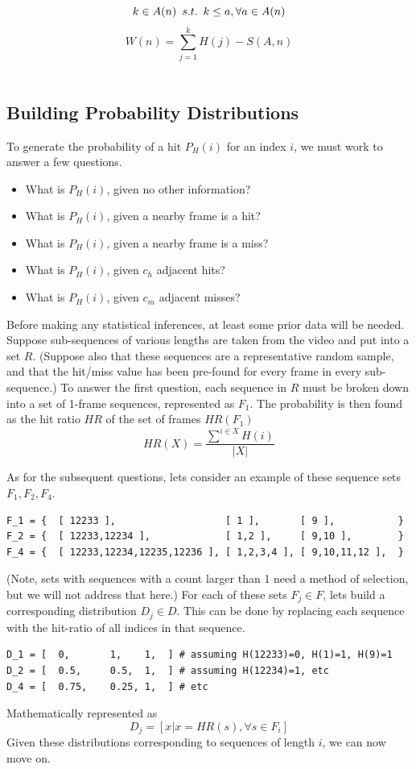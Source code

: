 \documentclass{article}
\def\suchThat{\hspace{0.5em} s.t. \hspace{0.5em}}
\newcommand{\br}{ \hfill \break}
\begin{document}
\begin{adjustwidth}{2.5em}{0pt}
            $$ k \in A(n) \suchThat k \leq a, \forall a \in A(n) $$
            $$ W(n) = \displaystyle\sum_{j=1}^{k} H(j) - S(A, n) $$ \\
        
    
    \subsection{Building Probability Distributions}
        To generate the probability of a hit $P_H(i)$ for an index $i$, we must work to answer a few questions.
        \begin{itemize}
            \item What is $P_H(i)$, given no other information?
            \item What is $P_H(i)$, given a nearby frame is a hit?
            \item What is $P_H(i)$, given a nearby frame is a miss?
            \item What is $P_H(i)$, given $c_h$ adjacent hits?
            \item What is $P_H(i)$, given $c_m$ adjacent misses?
        \end{itemize}
        Before making any statistical inferences, at least some prior data will be needed. Suppose sub-sequences of various lengths are taken from the video and put into a set $R$. (Suppose also that these sequences are a representative random sample, and that the hit/miss value has been pre-found for every frame in every sub-sequence.)
        \br
        \br
        To answer the first question, each sequence in $R$ must be broken down into a set of 1-frame sequences, represented as $F_1$. The probability is then found as the hit ratio $\mathit{HR}$ of the set of frames $HR(F_1)$
            $$ \mathit{HR}(X) =  \frac{ \displaystyle\sum^{i \in X} H(i) }{ |X| }  $$
        
        As for the subsequent questions, lets consider an example of these sequence sets $F_1, F_2, F_4$.
        \begin{lstlisting}
F_1 = {  [ 12233 ],                   [ 1 ],       [ 9 ],           }
F_2 = {  [ 12233,12234 ],             [ 1,2 ],     [ 9,10 ],        }
F_4 = {  [ 12233,12234,12235,12236 ], [ 1,2,3,4 ], [ 9,10,11,12 ],  }
        \end{lstlisting}
        (Note, sets with sequences with a count larger than 1 need a method of selection, but we will not address that here.)\br
        For each of these sets $F_j \in F$, lets build a corresponding distribution $D_j \in D$. This can be done by replacing each sequence with the hit-ratio of all indices in that sequence.
        \begin{lstlisting}
D_1 = [  0,       1,    1,  ] # assuming H(12233)=0, H(1)=1, H(9)=1
D_2 = [  0.5,     0.5,  1,  ] # assuming H(12234)=1, etc
D_4 = [  0.75,    0.25, 1,  ] # etc
        \end{lstlisting}
        Mathematically represented as
        $$ D_j = [ x | x = \mathit{HR}(s), \forall s \in F_i  ]  $$
        Given these distributions corresponding to sequences of length $i$, we can now move on.
        

\end{adjustwidth}
\end{document}
